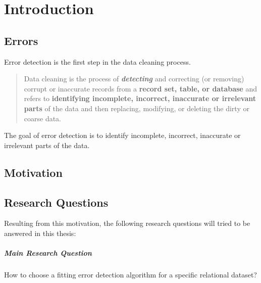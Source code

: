 \chapter{Introduction}
\label{chap:introduction}

\section{Errors}
\label{sec:errors}
Error detection is the first step in the data cleaning process.

\blockquote{Data cleaning is the process of \textbf{\textit{detecting}} and correcting (or removing) corrupt or inaccurate records from a \textbf{record set, table, or database} and refers to \textbf{identifying incomplete, incorrect, inaccurate or irrelevant parts} of the data and then replacing, modifying, or deleting the dirty or coarse data.}

The goal of error detection is to identify incomplete, incorrect, inaccurate or irrelevant parts of the data.



\section{Motivation}
\label{sec:motivation}




\section{Research Questions}
\label{sec:researchquestions}
Resulting from this motivation, the following research questions will tried to be answered in this thesis:

\paragraph{Main Research Question} How to choose a fitting error detection algorithm for a specific relational dataset?

